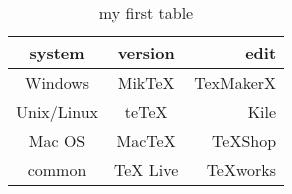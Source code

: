 \begin{table}[!]
\label{table1}
\caption{my first table}
\centering
\begin{tabular}{|c|c|r|}
	\hline
	system& version& edit\\
	\hline
	Windows & MikTeX & TexMakerX \\
	\hline
	Unix/Linux & teTeX & Kile \\
	\hline
	Mac OS & MacTeX & TeXShop \\
	\hline
	common& TeX Live & TeXworks \\
	\hline
\end{tabular}
\end{table}
